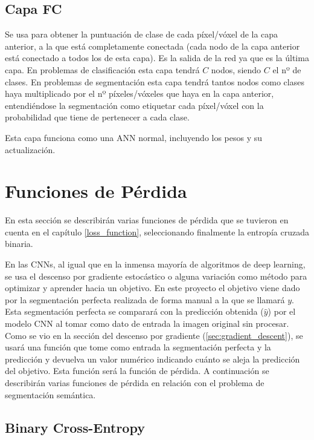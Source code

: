 \subsection{Capa FC}\label{cnn_capa_fc}

Se usa para obtener la puntuación de clase de cada píxel/vóxel de la capa anterior, a la que está completamente conectada (cada nodo de la capa anterior está conectado a todos los de esta capa). Es la salida de la red ya que es la última capa. En problemas de clasificación esta capa tendrá $C$ nodos, siendo $C$ el nº de clases. En problemas de segmentación esta capa tendrá tantos nodos como clases haya multiplicado por el nº píxeles/vóxeles que haya en la capa anterior, entendiéndose la segmentación como etiquetar cada píxel/vóxel con la probabilidad que tiene de pertenecer a cada clase.

Esta capa funciona como una ANN normal, incluyendo los pesos y su actualización.

\section{Funciones de Pérdida}\label{cnn_loss_func}

En esta sección se describirán varias funciones de pérdida que se tuvieron en cuenta en el capítulo \ref{loss_function}, seleccionando finalmente la entropía cruzada binaria.

En las CNNs, al igual que en la inmensa mayoría de algoritmos de deep learning, se usa el descenso por gradiente estocástico o alguna variación como método para optimizar y aprender hacia un objetivo. En este proyecto el objetivo viene dado por la segmentación perfecta realizada de forma manual a la que se llamará $y$. Esta segmentación perfecta se comparará con la predicción obtenida ($\hat{y}$) por el modelo CNN al tomar como dato de entrada la imagen original sin procesar. Como se vio en la sección del descenso por gradiente (\ref{sec:gradient_descent}), se usará una función que tome como entrada la segmentación perfecta y la predicción y devuelva un valor numérico indicando cuánto se aleja la predicción del objetivo. Esta función será la función de pérdida. A continuación se describirán varias funciones de pérdida en relación con el problema de segmentación semántica.

\subsection{Binary Cross-Entropy}\label{cnn_bce}

